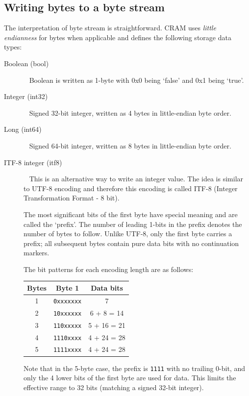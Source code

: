 \documentclass[a4paper]{article}
\begin{document}
\subsection{\textbf{Writing bytes to a byte stream}}

The interpretation of byte stream is straightforward. CRAM uses \emph{little endianness}
for bytes when applicable and defines the following storage data types:

\begin{description}

\item[Boolean (bool)]\ \newline
Boolean is written as 1-byte with 0x0 being `false' and 0x1 being `true'.

\item[Integer (int32)]\ \newline
Signed 32-bit integer, written as 4 bytes in little-endian byte order.

\item[Long (int64)]\ \newline
Signed 64-bit integer, written as 8 bytes in little-endian byte order.

\item[ITF-8 integer (itf8)]\ \newline
This is an alternative way to write an integer value. The idea is similar to UTF-8 
encoding and therefore this encoding is called ITF-8 (Integer Transformation Format 
- 8 bit). 

The most significant bits of the first byte have special meaning and are called
the `prefix'. The number of leading 1-bits in the prefix denotes the number of
bytes to follow. Unlike UTF-8, only the first byte carries a prefix;
all subsequent bytes contain pure data bits with no continuation markers.

The bit patterns for each encoding length are as follows:

\begin{tabular}{|c|c|c|}
\hline
\textbf{Bytes} & \textbf{Byte 1} & \textbf{Data bits}\tabularnewline
\hline
1 & \texttt{0xxxxxxx} & 7\tabularnewline
\hline
2 & \texttt{10xxxxxx} & 6 + 8 = 14\tabularnewline
\hline
3 & \texttt{110xxxxx} & 5 + 16 = 21\tabularnewline
\hline
4 & \texttt{1110xxxx} & 4 + 24 = 28\tabularnewline
\hline
5 & \texttt{1111xxxx} & 4 + 24 = 28\tabularnewline
\hline
\end{tabular}

\noindent Note that in the 5-byte case, the prefix is \texttt{1111} with no trailing 0-bit,
and only the 4 lower bits of the first byte are used for data. This limits the
effective range to 32 bits (matching a signed 32-bit integer).


\end{description}
\end{document}
